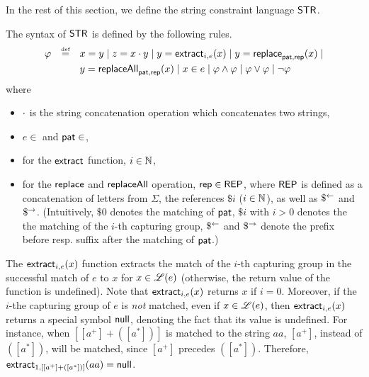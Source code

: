 
In the rest of this section, we define the string constraint language $\mathsf{STR}$. 

The syntax of $\mathsf{STR}$ is defined by the following rules.
\[
\begin{array}{l c l}
\smallskip
\varphi & \eqdef  & x = y \mid z = x \concat y \mid y  = \extract_{i, e}(x) \mid
y  = \replace_{\pat, \rep}(x) \mid 
\\
& & y = \replaceall_{\pat, \rep}(x)   \mid
 x \in e \mid  \varphi \wedge \varphi \mid \varphi \vee \varphi \mid \neg \varphi \
\label{eq:SL}
\end{array}
\]
where
\begin{itemize}
	\item $\cdot$ is the string concatenation operation which concatenates two strings,
%
\item  $e \in${\regexp} and $\mathsf{pat} \in${\regexp},
%
\item for the $\mathsf{extract}$ function, $i \in \mathbb{N}$,
%
	\item  for the $\mathsf{replace}$ and $\mathsf{replaceAll}$ operation, $\mathsf{rep} \in {\sf REP}$, where ${\sf REP}$ is defined as a concatenation of letters from $\Sigma$, the references $\$i$ ($i \in \mathbb{N}$), as well as $\$^{\leftarrow}$ and $\$^{\rightarrow}$. (Intuitively, $\$0$ denotes the matching of $\mathsf{pat}$, $\$i$ with $i > 0$ denotes the the matching of the $i$-th capturing group, $\$^{\leftarrow}$ and $\$^{\rightarrow}$ denote the prefix before resp. suffix after the matching of $\mathsf{pat}$.)
%
\end{itemize}

The $\mathsf{extract}_{i, e}(x)$ function extracts the match of the $i$-th capturing group in the successful match of $e$ to $x$ for $x \in \mathscr{L}(e)$ (otherwise, the return value of the function is undefined). Note that $\mathsf{extract}_{i, e}(x)$ returns $x$ if $i=0$. Moreover, if the $i$-the capturing group of $e$ is \emph{not} matched, even if $x \in \mathscr{L}(e)$, then $\mathsf{extract}_{i, e}(x)$ returns a special symbol $\mathsf{null}$, denoting the fact that its value is undefined. For instance, when $[[a^+] + ([a^*])]$ is matched to the string $aa$, $[a^+]$, instead of $([a^*])$, will be matched, since $[a^+]$ precedes $([a^*])$. Therefore, $\mathsf{extract}_{1, [[a^+] + ([a^*])]}(aa) = \mathsf{null}$. 

%


